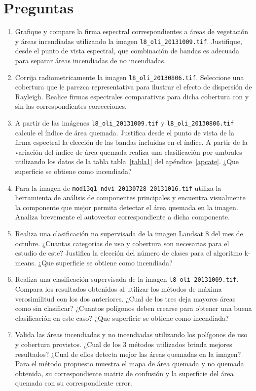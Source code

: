 \documentclass[hidelinks,12pt]{article}
\begin{document}
\section{Preguntas}
\begin{enumerate}
\item Grafique y compare la firma espectral correspondientes a áreas de
    vegetación y áreas incendiadas utilizando la imagen
        \texttt{l8\_oli\_20131009.tif}. Justifique, desde el punto de vista espectral, que combinación de bandas es adecuada para separar áreas incendiadas de no incendiadas.
\item Corrija radiometricamente la imagen \texttt{l8\_oli\_20130806.tif}. Seleccione una cobertura que le parezca representativa para ilustrar el efecto de dispersión de Rayleigh. Realice firmas espectrales comparativas para dicha cobertura con y sin las correspondientes correcciones.
\item A partir de las imágenes \texttt{l8\_oli\_20131009.tif} y
    \texttt{l8\_oli\_20130806.tif} calcule el índice de área quemada. Justifica desde el punto de vista de la firma espectral la elección de las bandas incluidas en el índice. A partir de la variación del índice de área quemada realiza una clasificación por umbrales utilizando los datos de la tabla tabla~\ref{tabla1} del ap\'endice~\ref{apcate}. ¿Que superficie se obtiene como incendiada?
\item Para la imagen de \texttt{mod13q1\_ndvi\_20130728\_20131016.tif} utiliza la herramienta de análisis de componentes principales y encuentra visualmente la componente que mejor permita detectar el área quemada en la imagen. Analiza brevemente el autovector correspondiente a dicha componente.
\item  Realiza una clasificación no supervisada de la imagen Landsat 8 del mes de octubre. ¿Cuantas categorías de uso y cobertura son necesarias para el estudio de este? Justifica la elección del número de clases para el algoritmo k-means. ¿Que superficie se obtiene como incendiada?
\item Realiza una clasificación supervisada de la imagen
    \texttt{l8\_oli\_20131009.tif}. Compara los resultados obtenidos al utilizar los métodos de máxima verosimilitud con los dos anteriores. ¿Cual de los tres deja mayores áreas como sin clasificar? ¿Cuantos polígonos deben crearse para obtener una buena clasificación en este caso? ¿Que superficie se obtiene como incendiada?
\item Valida las áreas incendiadas y no incendiadas utilizando los polígonos de uso y cobertura provistos. ¿Cual de los 3 métodos utilizados brinda mejores resultados? ¿Cual de ellos detecta mejor las áreas quemadas en la imagen? Para el método propuesto muestra el mapa de área quemada y no quemada obtenida, su correspondiente matriz de confusión y la superficie del área quemada con su correspondiente error.
\end{enumerate}
\newpage
\appendix
\end{document}
